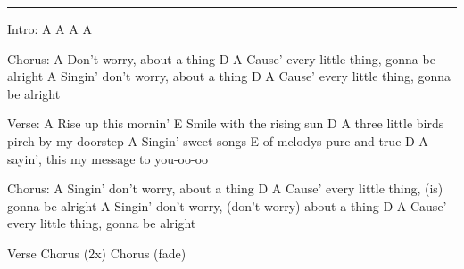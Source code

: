 \noindent\rule{\columnwidth}{1pt}

\begin{multicols}{2}
\begin{lstsong}
Intro: A  A  A  A

Chorus:
A
Don't worry, about a thing
       D                              A
Cause' every little thing, gonna be alright
         A
Singin' don't worry, about a thing
       D                              A
Cause' every little thing, gonna be alright

Verse:
A
Rise up this mornin'
               E
Smile with the rising sun
             D                 A
three little birds pirch by my doorstep
        A
Singin' sweet songs
           E
of melodys pure and true
        D                  A
sayin', this my message to you-oo-oo











Chorus:
        A
Singin' don't worry, about a thing
       D                                   A
Cause' every little thing, (is) gonna be alright
        A
Singin' don't worry, (don't worry) about a thing
       D                              A
Cause' every little thing, gonna be alright

Verse
Chorus (2x)
Chorus (fade)
\end{lstsong}
\end{multicols}
\newpage

